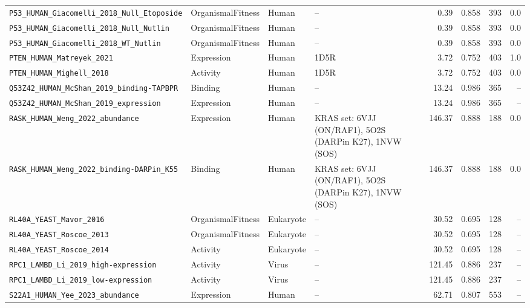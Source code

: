 \documentclass{article}
\begin{document}
\begin{longtable}{llllrrrr}
  \texttt{\scriptsize P53\_HUMAN\_Giacomelli\_2018\_Null\_Etoposide} & OrganismalFitness & Human & {\scriptsize --} & 0.39 & 0.858 & 393 & 0.0 \\
  \texttt{\scriptsize P53\_HUMAN\_Giacomelli\_2018\_Null\_Nutlin} & OrganismalFitness & Human & {\scriptsize --} & 0.39 & 0.858 & 393 & 0.0 \\
  \texttt{\scriptsize P53\_HUMAN\_Giacomelli\_2018\_WT\_Nutlin} & OrganismalFitness & Human & {\scriptsize --} & 0.39 & 0.858 & 393 & 0.0 \\
  \texttt{\scriptsize PTEN\_HUMAN\_Matreyek\_2021} & Expression & Human & {\scriptsize 1D5R} & 3.72 & 0.752 & 403 & 1.0 \\
  \texttt{\scriptsize PTEN\_HUMAN\_Mighell\_2018} & Activity & Human & {\scriptsize 1D5R} & 3.72 & 0.752 & 403 & 0.0 \\
  \texttt{\scriptsize Q53Z42\_HUMAN\_McShan\_2019\_binding-TAPBPR} & Binding & Human & {\scriptsize --} & 13.24 & 0.986 & 365 & -- \\
  \texttt{\scriptsize Q53Z42\_HUMAN\_McShan\_2019\_expression} & Expression & Human & {\scriptsize --} & 13.24 & 0.986 & 365 & -- \\
  \texttt{\scriptsize RASK\_HUMAN\_Weng\_2022\_abundance} & Expression & Human & {\scriptsize KRAS set: 6VJJ (ON/RAF1), 5O2S (DARPin K27), 1NVW (SOS)} & 146.37 & 0.888 & 188 & 0.0 \\
  \texttt{\scriptsize RASK\_HUMAN\_Weng\_2022\_binding-DARPin\_K55} & Binding & Human & {\scriptsize KRAS set: 6VJJ (ON/RAF1), 5O2S (DARPin K27), 1NVW (SOS)} & 146.37 & 0.888 & 188 & 0.0 \\
  \texttt{\scriptsize RL40A\_YEAST\_Mavor\_2016} & OrganismalFitness & Eukaryote & {\scriptsize --} & 30.52 & 0.695 & 128 & -- \\
  \texttt{\scriptsize RL40A\_YEAST\_Roscoe\_2013} & OrganismalFitness & Eukaryote & {\scriptsize --} & 30.52 & 0.695 & 128 & -- \\
  \texttt{\scriptsize RL40A\_YEAST\_Roscoe\_2014} & Activity & Eukaryote & {\scriptsize --} & 30.52 & 0.695 & 128 & -- \\
  \texttt{\scriptsize RPC1\_LAMBD\_Li\_2019\_high-expression} & Activity & Virus & {\scriptsize --} & 121.45 & 0.886 & 237 & -- \\
  \texttt{\scriptsize RPC1\_LAMBD\_Li\_2019\_low-expression} & Activity & Virus & {\scriptsize --} & 121.45 & 0.886 & 237 & -- \\
  \texttt{\scriptsize S22A1\_HUMAN\_Yee\_2023\_abundance} & Expression & Human & {\scriptsize --} & 62.71 & 0.807 & 553 & -- \\

\end{longtable}
\end{document}
